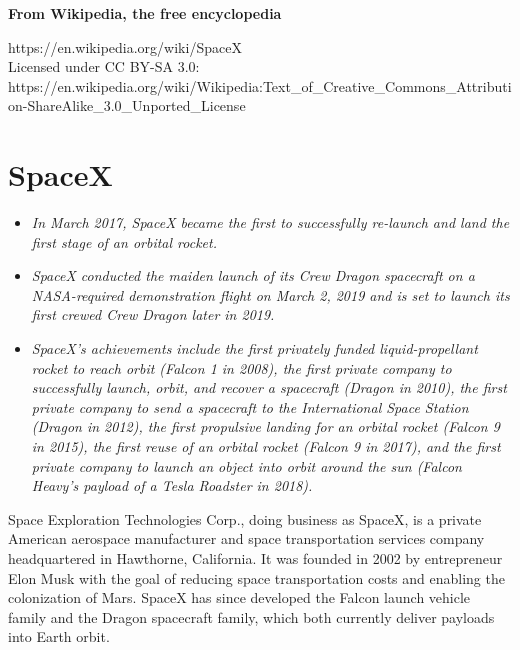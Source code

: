 \textbf{From Wikipedia, the free encyclopedia}

https://en.wikipedia.org/wiki/SpaceX\\
Licensed under CC BY-SA 3.0:\\
https://en.wikipedia.org/wiki/Wikipedia:Text\_of\_Creative\_Commons\_Attribution-ShareAlike\_3.0\_Unported\_License

\section{SpaceX}\label{spacex}

\begin{itemize}
\item
  \emph{In March 2017, SpaceX became the first to successfully re-launch
  and land the first stage of an orbital rocket.}
\item
  \emph{SpaceX conducted the maiden launch of its Crew Dragon spacecraft
  on a NASA-required demonstration flight on March 2, 2019 and is set to
  launch its first crewed Crew Dragon later in 2019.}
\item
  \emph{SpaceX's achievements include the first privately funded
  liquid-propellant rocket to reach orbit (Falcon 1 in 2008), the first
  private company to successfully launch, orbit, and recover a
  spacecraft (Dragon in 2010), the first private company to send a
  spacecraft to the International Space Station (Dragon in 2012), the
  first propulsive landing for an orbital rocket (Falcon 9 in 2015), the
  first reuse of an orbital rocket (Falcon 9 in 2017), and the first
  private company to launch an object into orbit around the sun (Falcon
  Heavy's payload of a Tesla Roadster in 2018).}
\end{itemize}

Space Exploration Technologies Corp., doing business as SpaceX, is a
private American aerospace manufacturer and space transportation
services company headquartered in Hawthorne, California. It was founded
in 2002 by entrepreneur Elon Musk with the goal of reducing space
transportation costs and enabling the colonization of Mars. SpaceX has
since developed the Falcon launch vehicle family and the Dragon
spacecraft family, which both currently deliver payloads into Earth
orbit.

